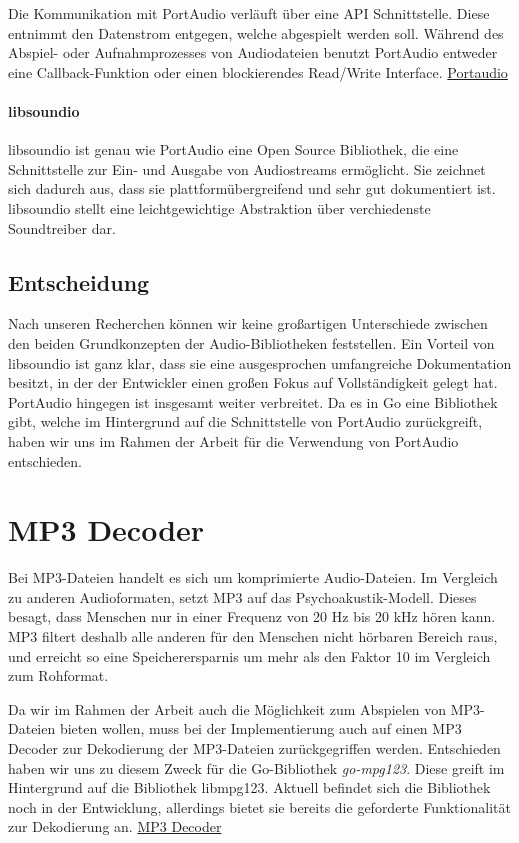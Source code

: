 Die Kommunikation mit PortAudio verläuft über eine \ac{API} Schnittstelle.
Diese entnimmt den Datenstrom entgegen, welche abgespielt werden soll. Während
des Abspiel- oder Aufnahmprozesses von Audiodateien benutzt PortAudio entweder
eine Callback-Funktion oder einen blockierendes Read/Write Interface.
\href{http://www.portaudio.com/}{Portaudio}

\paragraph{libsoundio}
libsoundio ist genau wie PortAudio eine Open Source Bibliothek, die eine
Schnittstelle zur Ein- und Ausgabe von Audiostreams ermöglicht. Sie zeichnet
sich dadurch aus, dass sie plattformübergreifend und sehr gut dokumentiert ist.
libsoundio stellt eine leichtgewichtige Abstraktion über verchiedenste
Soundtreiber dar.

\subsection{Entscheidung}
Nach unseren Recherchen können wir keine großartigen Unterschiede zwischen den
beiden Grundkonzepten der Audio-Bibliotheken feststellen. Ein Vorteil von
libsoundio ist ganz klar, dass sie eine ausgesprochen umfangreiche
Dokumentation besitzt, in der der Entwickler einen großen Fokus auf
Vollständigkeit gelegt hat. PortAudio hingegen ist insgesamt weiter verbreitet.
Da es in Go eine Bibliothek gibt, welche im Hintergrund auf die Schnittstelle
von PortAudio zurückgreift, haben wir uns im Rahmen der Arbeit für die
Verwendung von PortAudio entschieden.

\section{MP3 Decoder}
Bei MP3-Dateien handelt es sich um komprimierte Audio-Dateien. Im Vergleich zu
anderen Audioformaten, setzt MP3 auf das Psychoakustik-Modell. Dieses besagt,
dass Menschen nur in einer Frequenz von 20 Hz bis 20 kHz hören kann. MP3
filtert deshalb alle anderen für den Menschen nicht hörbaren Bereich raus, und
erreicht so eine Speicherersparnis um mehr als den Faktor 10 im Vergleich zum
Rohformat. \hfill \break

Da wir im Rahmen der Arbeit auch die Möglichkeit zum Abspielen von MP3-Dateien
bieten wollen, muss bei der Implementierung auch auf einen MP3 Decoder zur
Dekodierung der MP3-Dateien zurückgegriffen werden. Entschieden haben wir uns
zu diesem Zweck für die Go-Bibliothek \textit{go-mpg123}. Diese greift im
Hintergrund auf die Bibliothek libmpg123. Aktuell befindet sich die Bibliothek
noch in der Entwicklung, allerdings bietet sie bereits die geforderte
Funktionalität zur Dekodierung an.
\href{https://github.com/bobertlo/go-mpg123}{MP3 Decoder}

